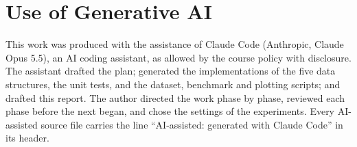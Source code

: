 \documentclass[acmsmall,nonacm]{acmart}
\begin{document}
\section*{Use of Generative AI}

This work was produced with the assistance of Claude Code (Anthropic, Claude
Opus 5.5), an AI coding assistant, as allowed by the course policy with
disclosure. The assistant drafted the plan; generated the implementations of
the five data structures, the unit tests, and the dataset, benchmark and
plotting scripts; and drafted this report. The author directed the work phase
by phase, reviewed each phase before the next began, and chose the settings of
the experiments. Every AI-assisted source file carries the line
``AI-assisted: generated with Claude Code'' in its header.



\end{document}

